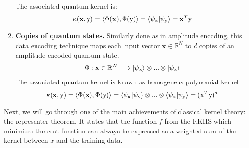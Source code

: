 \begin{enumerate}
    The associated quantum kernel is:
    $$\kappa(\mathbf{x},\mathrm{y})=\left< \Phi(\mathbf{x}),\Phi(\mathrm{y}) \right> = \braket{\psi_{\mathbf{x}} | \psi_{\mathrm{y}}} = \mathbf{x}^{T} \mathrm{y}$$

    \item \textbf{Copies of quantum states. } Similarly done as in amplitude encoding, this data encoding technique maps each input vector $\mathbf{x} \in \mathbb{R}^N$ to $d$ copies of an amplitude encoded quantum state.
    \begin{equation*}
        \Phi: \mathbf{x}\in \mathbb{R}^N \longrightarrow \ket{\psi_{\mathbf{x}}} \otimes ... \otimes \ket{\psi_{\mathbf{x}}}
    \end{equation*}
    The associated quantum kernel is known as homogeneus polynomial kernel
    $$\kappa(\mathbf{x},\mathrm{y})=\left< \Phi(\mathbf{x}),\Phi(\mathrm{y}) \right> = \braket{\psi_{\mathbf{x}} | \psi_{\mathrm{y}}} \otimes ... \otimes \braket{\psi_{\mathbf{x}} | \psi_{\mathrm{y}}} = (\mathbf{x}^{T} \mathrm{y})^d$$

\end{enumerate}





Next, we will go through one of the main achievements of classical kernel theory: the representer theorem. It states that the function $f$ from the RKHS which minimises the cost function can always be expressed as a weighted sum of the kernel between $x$ and the training data. 

